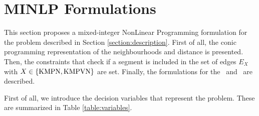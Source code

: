 \documentclass[a4paper,  review, authoryear, 1p.]{elsarticle}
\newcommand{\KMPN}{{\sf{H-KMPN}}}
\newcommand{\KMPVN}{{\sf{H-KMPVN}\xspace }}
\begin{document}
	\section{MINLP Formulations}\label{section:formulations}

	This section proposes a mixed-integer NonLinear Programming formulation for the problem described in Section \ref{section:description}. First of all, the conic programming representation of the neighbourhoods and distance is presented. Then, the constraints that check if a segment is included in the set of edges $E_X$ with $X\in \{\rm KMPN, \rm KMPVN\}$ are set. Finally, the formulations for the \KMPN \ and \KMPVN \ are described.
	
	First of all, we introduce the decision variables that represent the problem. These are summarized in Table \ref{table:variables}.
	
\end{document}
